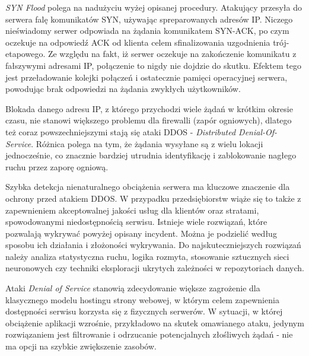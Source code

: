 \documentclass[12pt,twoside]{article}
\begin{document}
\emph{SYN Flood} polega na nadużyciu wyżej opisanej procedury. Atakujący przesyła do serwera falę komunikatów SYN, używając spreparowanych adresów IP. Niczego nieświadomy serwer odpowiada na żądania komunikatem SYN-ACK, po czym oczekuje na odpowiedź ACK od klienta celem sfinalizowania uzgodnienia trój-etapowego. Ze względu na fakt, iż serwer oczekuje na zakończenie komunikatu z fałszywymi adresami IP, połączenie to nigdy nie dojdzie do skutku. Efektem tego jest przeładowanie kolejki połączeń i ostatecznie pamięci operacyjnej serwera, powodując brak odpowiedzi na żądania zwykłych użytkowników. \cite{DDosHowItWorks}

Blokada danego adresu IP, z którego przychodzi wiele żądań w krótkim okresie czasu, nie stanowi większego problemu dla firewalli (zapór ogniowych), dlatego też coraz powszechniejszymi stają się ataki DDOS - \emph{Distributed Denial-Of-Service}. Różnica polega na tym, że żądania wysyłane są z wielu lokacji jednocześnie, co znacznie bardziej utrudnia identyfikację i zablokowanie nagłego ruchu przez zaporę ogniową.

Szybka detekcja nienaturalnego obciążenia serwera ma kluczowe znaczenie dla ochrony przed atakiem DDOS. W przypadku przedsiębiorstw wiąże się to także z zapewnieniem akceptowalnej jakości usług dla klientów oraz stratami, spowodowanymi niedostępnością serwisu. Istnieje wiele rozwiązań, które pozwalają wykrywać powyżej opisany incydent. Można je podzielić według sposobu ich działania i złożoności wykrywania. Do najskuteczniejszych rozwiązań należy analiza statystyczna ruchu, logika rozmyta, stosowanie sztucznych sieci neuronowych czy techniki eksploracji ukrytych zależności w repozytoriach danych. \cite{DDosDetection}

Ataki \emph{Denial of Service} stanowią zdecydowanie większe zagrożenie dla klasycznego modelu hostingu strony webowej, w którym celem zapewnienia dostępności serwisu korzysta się z fizycznych serwerów. W sytuacji, w której obciążenie aplikacji wzrośnie, przykładowo na skutek omawianego ataku, jedynym rozwiązaniem jest filtrowanie i odrzucanie potencjalnych złośliwych żądań - nie ma opcji na szybkie zwiększenie zasobów. 
\end{document}
